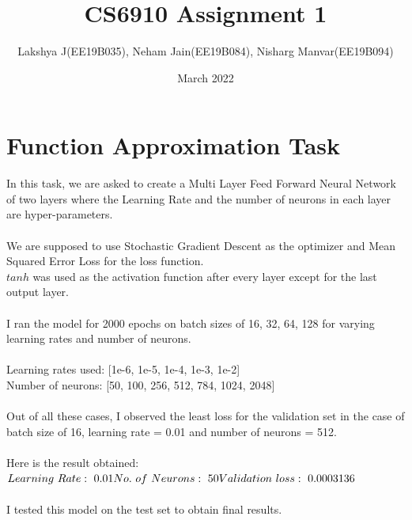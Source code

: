 \documentclass[10pt,a4paper]{article}
\title{CS6910 Assignment 1}
\author{Lakshya J(EE19B035), Neham Jain(EE19B084), Nisharg Manvar(EE19B094)}
\date{March 2022}
\begin{document}
\maketitle

\section{Function Approximation Task}
In this task, we are asked to create a Multi Layer Feed Forward Neural Network of two layers where the Learning Rate and the number of neurons in each layer are hyper-parameters.\\
\\
We are supposed to use Stochastic Gradient Descent as the optimizer and Mean Squared Error Loss for the loss function.\\
$tanh$ was used as the activation function after every layer except for the last output layer.\\
\\
I ran the model for 2000 epochs on  batch sizes of 16, 32, 64, 128 for varying learning rates and number of neurons.\\
\\
Learning rates used: [1e-6, 1e-5, 1e-4, 1e-3, 1e-2]\\
Number of neurons: [50, 100, 256, 512, 784, 1024, 2048]\\
\\
Out of all these cases, I observed the least loss for the validation set in the case of batch size of 16, learning rate = 0.01 and number of neurons = 512.\\
\\
Here is the result obtained:\\
$Learning\ Rate:\ 0.01\\
No.\ of\ Neurons:\ 50\\
Validation\ loss:\ 0.0003136$\\
\\
I tested this model on the test set to obtain final results.
\\
\newpage
\end{document}
